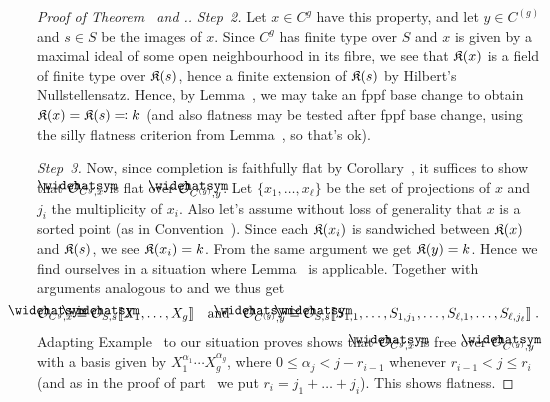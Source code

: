 \documentclass[a4paper,parskip=half,numbers=enddot, DIV=12]{scrreprt}
\renewcommand{\leq}{\leqslant}
\begin{document}
\begin{proof}[Proof of Theorem~ and .]
	\emph{Step~2.} Let $x\in C^g$ have this property, and let $y\in C^{(g)}$ and $s\in S$ be the images of $x$. Since $C^g$ has finite type over $S$ and $x$ is given by a maximal ideal of some open neighbourhood in its fibre, we see that $\mathfrak{K}(x)$ is a field of finite type over $\mathfrak{K}(s)$, hence a finite extension of $\mathfrak{K}(s)$ by Hilbert's Nullstellensatz. Hence, by Lemma~, we may take an fppf base change to obtain $\mathfrak{K}(x)=\mathfrak{K}(s)\eqqcolon k$ (and also flatness may be tested after fppf base change, using the silly flatness criterion from Lemma~, so that's ok). 
	
	\emph{Step~3.} Now, since completion is faithfully flat by Corollary~, it suffices to show that $\roof{\Oo}_{C^g,x}$ is flat over $\roof{\Oo}_{C^{(g)},y}$. Let $\{x_1,\ldots,x_\ell\}$ be the set of projections of $x$ and $j_i$ the multiplicity of $x_i$. Also let's assume without loss of generality that $x$ is a sorted point (as in Convention~). Since each $\mathfrak{K}(x_i)$ is sandwiched between $\mathfrak{K}(x)$ and $\mathfrak{K}(s)$, we see $\mathfrak{K}(x_i)=k$. From the same argument we get $\mathfrak{K}(y)=k$. Hence we find ourselves in a situation where Lemma~ is applicable. Together with arguments analogous to  and  we thus get
	\begin{align}\lbl{eq:OCgx3}
		\roof{\Oo}_{C^g,x}\cong \roof{\Oo}_{S,s}\llbracket X_1,\ldots,X_g\rrbracket\quad\text{and}\quad\roof{\Oo}_{C^{(g)},y}\cong \roof{\Oo}_{S,s}\llbracket S_{1,1},\ldots,S_{1,j_1},\ldots,S_{\ell,1},\ldots,S_{\ell,j_\ell}\rrbracket\;.
	\end{align}
	Adapting Example~ to our situation proves shows that $\roof{\Oo}_{C^g,x}$ is free over $\roof{\Oo}_{C^{(g)},y}$ with a basis given by $X_1^{\alpha_1}\cdots X_g^{\alpha_g}$, where $0\leq \alpha_j<j-r_{i-1}$ whenever $r_{i-1}<j\leq r_i$ (and as in the proof of part~ we put $r_i=j_1+\ldots+j_i$). This shows flatness.
	

\end{proof}
\end{document}
